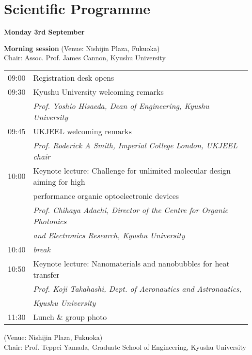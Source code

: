 \section{Scientific Programme}

\begin{center}
{\bf \large Monday 3rd September}
\end{center}
\vspace*{3ex}
{\bf Morning session} (Venue: Nishijin Plaza, Fukuoka)\\
Chair: Assoc. Prof. James Cannon, Kyushu University

\vspace{1em}
\noindent\begin{tabular}{|l|l|}
    \hline
    09:00   & Registration desk opens \\
    09:30   & Kyushu University welcoming remarks \\
            & \emph{Prof. Yoshio Hisaeda, Dean of Engineering, Kyushu University} \\
    09:45   & UKJEEL welcoming remarks \\
            & \emph{Prof. Roderick A Smith, Imperial College London, UKJEEL chair} \\
    10:00   & Keynote lecture: Challenge for unlimited molecular design aiming for high\\
            &  \hspace{7.5em} performance organic optoelectronic devices \\
            & \emph{Prof. Chihaya Adachi, Director of the Centre for Organic Photonics}\\
            & \emph{and Electronics Research, Kyushu University} \\
    10:40   & \emph{break} \\
    10:50   & Keynote lecture: Nanomaterials and nanobubbles for heat transfer \\
            & \emph{Prof. Koji Takahashi, Dept. of Aeronautics and Astronautics,} \\
            & \emph{Kyushu University} \\
    11:30   & Lunch \& group photo \\
    \hline
\end{tabular}

\newpage
\vspace{-3em}
 (Venue: Nishijin Plaza, Fukuoka)\\
Chair: Prof. Teppei Yamada, Graduate School of Engineering, Kyushu University

